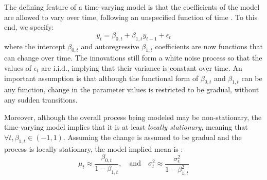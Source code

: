 The defining feature of a time-varying model is that the coefficients of the model are allowed to vary over time, following an unspecified function of time \cite{dahlhaus1997fitting,giraitis2014inference}. To this end, we specify:
\begin{equation}
    y_t = \beta_{0,t} + \beta_{1,t} y_{t-1} + \epsilon_t
\end{equation}
where the intercept $\beta_{0,t}$ and autoregressive $\beta_{1,t}$ coefficients are now functions that can change over time. The innovations still form a white noise process so that the values of $\epsilon_t$ are i.i.d., implying that their variance is constant over time. An important assumption is that although the functional form of $\beta_{0,t}$ and $\beta_{1,t}$ can be any function, change in the parameter values is restricted to be gradual, without any sudden transitions. 

Moreover, although the overall process being modeled may be non-stationary, the time-varying model implies that it is at least \textit{locally stationary}, meaning that $\forall t, \beta_{1,t} \in (-1, 1)$. Assuming the change is assumed to be gradual and the process is locally stationary, the model implied mean is \cite{giraitis2014inference}:
\begin{equation}
    \mu_t \approx \frac{\beta_{0,t}}{1 - \beta_{1,t}}, \quad \text{and} \quad \sigma_t^2 \approx \frac{\sigma_{\epsilon}^2}{1 - \beta_{1,t}^2}
\end{equation}
